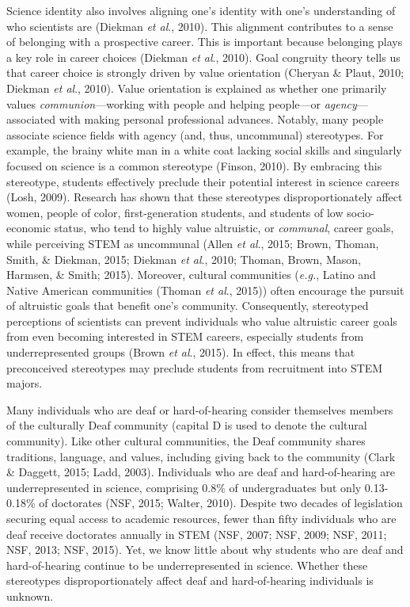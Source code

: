 \documentclass[11.5pt]{sig-alternate} %
\begin{document}
\begin{large}
Science identity also involves aligning one’s identity with one’s understanding of who scientists are (Diekman \textit{et al}., 2010). This alignment contributes to a sense of belonging with a prospective career. This is important because belonging plays a key role in career choices (Diekman \textit{et al}., 2010). Goal congruity theory tells us that career choice is strongly driven by value orientation (Cheryan \& Plaut, 2010; Diekman \textit{et al}., 2010). Value orientation is explained as whether one primarily values \textit{communion}—working with people and helping people—or \textit{agency}—associated with making personal professional advances. Notably, many people associate science fields with agency (and, thus, uncommunal) stereotypes. For example, the brainy white man in a white coat lacking social skills and singularly focused on science is a common stereotype (Finson, 2010). By embracing this stereotype, students effectively preclude their potential interest in science careers (Losh, 2009). Research has shown that these stereotypes disproportionately affect women, people of color, first-generation students, and students of low socio-economic status, who tend to highly value altruistic, or \textit{communal}, career goals, while perceiving STEM as uncommunal (Allen \textit{et al}., 2015; Brown, Thoman, Smith, \& Diekman, 2015; Diekman \textit{et al}., 2010; Thoman, Brown, Mason, Harmsen, \& Smith; 2015). Moreover, cultural communities (\textit{e.g.}, Latino and Native American communities (Thoman \textit{et al}., 2015)) often encourage the pursuit of altruistic goals that benefit one’s community. Consequently, stereotyped perceptions of scientists can prevent individuals who value altruistic career goals from even becoming interested in STEM careers, especially students from underrepresented groups (Brown \textit{et al}., 2015). In effect, this means that preconceived stereotypes may preclude students from recruitment into STEM majors.

Many individuals who are deaf or hard-of-hearing consider themselves members of the culturally Deaf community (capital D is used to denote the cultural community). Like other cultural communities, the Deaf community shares traditions, language, and values, including giving back to the community (Clark \& Daggett, 2015; Ladd, 2003). Individuals who are deaf and hard-of-hearing are underrepresented in science, comprising 0.8\% of undergraduates but only 0.13-0.18\% of doctorates (NSF, 2015; Walter, 2010). Despite two decades of legislation securing equal access to academic resources, fewer than fifty individuals who are deaf receive doctorates annually in STEM (NSF, 2007; NSF, 2009; NSF, 2011; NSF, 2013; NSF, 2015). Yet, we know little about why students who are deaf and hard-of-hearing continue to be underrepresented in science. Whether these stereotypes disproportionately affect deaf and hard-of-hearing individuals is unknown.


\end{large}
\end{document}
